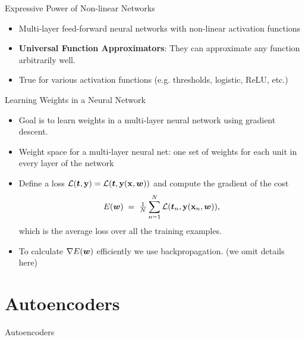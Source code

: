 \documentclass[11pt,handout,aspectratio=169]{beamer}
\begin{document}
\begin{frame}{Expressive Power of Non-linear Networks}
  \begin{itemize}
  \setlength\itemsep{1em}
    \item Multi-layer feed-forward neural networks  with non-linear activation functions
    \item \textbf{Universal Function Approximators}:  They can approximate any function arbitrarily well.
    \item True for various activation functions  (e.g. thresholds, logistic, ReLU, etc.)
  \end{itemize}
\end{frame}


\begin{frame}{Learning Weights in a Neural Network}

\begin{itemize}
\item Goal is to learn weights in a multi-layer neural network 
using gradient descent.
\medskip

\item Weight space for a multi-layer neural net: one set of weights for each unit in every layer of the network
\medskip

\item Define a loss $\mathcal L(\boldsymbol t,\mathbf{y})=\mathcal L(\boldsymbol t,\mathbf{y}(\mathbf{x},\boldsymbol w))$ and compute the gradient of the cost $$E(\boldsymbol w)\;=\;\tfrac1N\sum_{n=1}^N \mathcal L(\boldsymbol t_n,\mathbf{y}(\mathbf{x}_n,\boldsymbol w)),$$
which is the average loss over all the training examples.
\medskip
\item To calculate $\nabla E ( \boldsymbol w)$ efficiently we use backpropagation. (we omit details here)
\end{itemize}
\end{frame}


\section{Autoencoders}

\begin{frame}{}
	\begin{center}
		\alert{{\Huge Autoencoders}}
	\end{center}
\end{frame}
\end{document}
